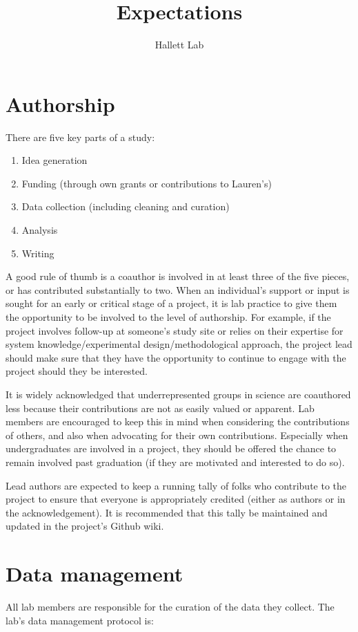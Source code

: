 \documentclass[12pt]{article}
\title{Expectations}
\author{Hallett Lab}
\date{}
\begin{document}
\maketitle

\section{Authorship}
There are five key parts of a study:
\begin{enumerate}
\item Idea generation
\item Funding (through own grants or contributions to Lauren's)
\item Data collection (including cleaning and curation)
\item Analysis
\item Writing
\end{enumerate}

A good rule of thumb is a coauthor is involved in at least three
of the five pieces, or has contributed substantially to two. When an individual's support or input is sought for an early or critical stage of a project, it is lab practice to give them the opportunity to be involved to the level of authorship. For example, if the project involves follow-up at someone's study site or relies on their expertise for system knowledge/experimental design/methodological approach, the project lead should make sure that they have the opportunity to continue to engage with the project should they be interested. 

It is widely acknowledged that underrepresented
groups in science are coauthored less because their contributions are
not as easily valued or apparent. Lab members are encouraged to keep
this in mind when considering the contributions of others, and also
when advocating for their own contributions. Especially when undergraduates are involved in a project, they should be offered the chance to remain involved past graduation (if they are motivated and interested to do so). 

Lead authors are expected to keep a running tally of folks who contribute to the project to ensure that everyone is appropriately credited (either as authors or in the acknowledgement). It is recommended that this tally be maintained and updated in the project's Github wiki.

\section{Data management}
All lab members are responsible for the curation of the data they
collect. The lab's data management protocol is:
\end{document}
